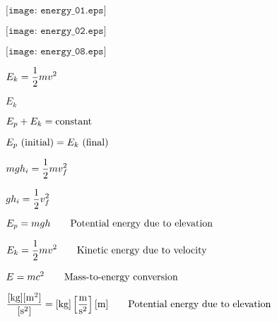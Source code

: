 \documentclass[12pt,a4paper,margin=2cm]{book}
\def\lthtmlcheckvsize{\ifdim\ht\sizebox<\vsize 
  \ifdim\wd\sizebox<\hsize\expandafter\hfill\fi \expandafter\vfill
  \else\expandafter\vss\fi}%
\begin{document}
{\newpage\clearpage
{}%
$\displaystyle \texttt{[image: energy\_01.eps]}$%
\lthtmlindisplaymathZ
\lthtmlcheckvsize\clearpage}

{\newpage\clearpage
{}%
$\displaystyle \texttt{[image: energy\_02.eps]}$%
\lthtmlindisplaymathZ
\lthtmlcheckvsize\clearpage}

{\newpage\clearpage
{}%
$\displaystyle \texttt{[image: energy\_08.eps]}$%
\lthtmlindisplaymathZ
\lthtmlcheckvsize\clearpage}

{\newpage\clearpage
{}%
$\displaystyle E_k = {1 \over 2} mv^2$%
\lthtmlindisplaymathZ
\lthtmlcheckvsize\clearpage}

{\newpage\clearpage
{}%
$ E_k$%
\lthtmlindisplaymathZ
\lthtmlcheckvsize\clearpage}

{\newpage\clearpage
{}%
$\displaystyle E_p + E_k = \hbox{constant}$%
\lthtmlindisplaymathZ
\lthtmlcheckvsize\clearpage}

{\newpage\clearpage
{}%
$\displaystyle E_p \hbox{ (initial)} = E_k \hbox{ (final)}$%
\lthtmlindisplaymathZ
\lthtmlcheckvsize\clearpage}

{\newpage\clearpage
{}%
$\displaystyle mgh_i = {1 \over 2} mv^2_f$%
\lthtmlindisplaymathZ
\lthtmlcheckvsize\clearpage}

{\newpage\clearpage
{}%
$\displaystyle gh_i = {1 \over 2} v^2_f$%
\lthtmlindisplaymathZ
\lthtmlcheckvsize\clearpage}

{\newpage\clearpage
{}%
$\displaystyle E_p = mgh \hbox{\hskip 20pt Potential energy due to elevation}$%
\lthtmlindisplaymathZ
\lthtmlcheckvsize\clearpage}

{\newpage\clearpage
{}%
$\displaystyle E_k = {1 \over 2} mv^2 \hbox{\hskip 20pt Kinetic energy due to velocity}$%
\lthtmlindisplaymathZ
\lthtmlcheckvsize\clearpage}

{\newpage\clearpage
{}%
$\displaystyle E = mc^2 \hbox{\hskip 20pt Mass-to-energy conversion}$%
\lthtmlindisplaymathZ
\lthtmlcheckvsize\clearpage}

{\newpage\clearpage
{}%
$\displaystyle {[\hbox{kg}][\hbox{m}^2] \over [\hbox{s}^2]} = [\hbox{kg}] \left[\hbox{m} \over \hbox{s}^2\right] [\hbox{m}] \hbox{\hskip 20pt Potential energy due to elevation}$%
\lthtmlindisplaymathZ
\lthtmlcheckvsize\clearpage}
\end{document}
